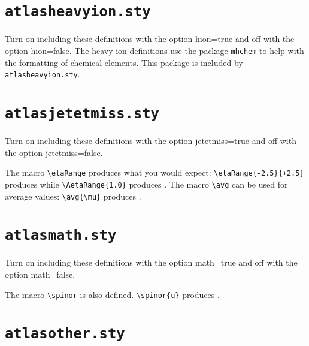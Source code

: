 \documentclass[UKenglish,texlive=2013]{\ATLASLATEXPATH atlasdoc}
\newcommand{\File}[1]{\texttt{#1}\xspace}
\newcommand{\Macro}[1]{\texttt{\textbackslash #1}\xspace}
\newcommand{\Option}[1]{\textsf{#1}\xspace}
\newcommand{\Package}[1]{\texttt{#1}\xspace}
\begin{document}
{


\newpage
\section{\File{atlasheavyion.sty}}

Turn on including these definitions with the option \Option{hion=true} and off with the option \Option{hion=false}.
The heavy ion definitions use the package \Package{mhchem} to help with the formatting of chemical elements.
This package is included by \File{atlasheavyion.sty}.



%


\newpage
\section{\File{atlasjetetmiss.sty}}

Turn on including these definitions with the option \Option{jetetmiss=true} and off with the option \Option{jetetmiss=false}.



\noindent The macro \Macro{etaRange} produces what you would expect:
\verb|\etaRange{-2.5}{+2.5}| produces  while
\verb|\AetaRange{1.0}| produces .
The macro \Macro{avg} can be used for average values:
\verb|\avg{\mu}| produces \avg{\mu}.


\newpage
\section{\File{atlasmath.sty}}

Turn on including these definitions with the option \Option{math=true} and off with the option \Option{math=false}.



\noindent The macro \Macro{spinor} is also defined.
\verb|\spinor{u}| produces .


\newpage
\section{\File{atlasother.sty}}

}
\end{document}
